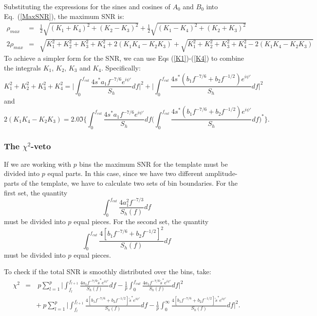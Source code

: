 Substituting the expressions for the sines and cosines of $A_0$ and
$B_0$
into Eq.~(\ref{MaxSNR}), the maximum SNR is:
\begin{eqnarray}
 \rho_{max} &=& \frac{1}{2} \sqrt{(K_1+K_4)^2 + (K_2-K_3)^2} +
\frac{1}{2} \sqrt{(K_1-K_4)^2 +(K_2+K_3)^2}\\
2\rho_{max}&=& \sqrt{ K_1^2 + K_2^2 + K_3^2 +K_4^2 + 2(K_1 K_4
	- K_2 K_3)} + \sqrt{  K_1^2 + K_2^2 + K_3^2 +K_4^2 -2(K_1
	K_4 -  K_2 K_3)} 
\end{eqnarray}
To achieve a simpler form for the SNR, we can use Eqs (\ref{K1})-(\ref{K4}) to 
combine the integrals $K_1$, $K_2$, $K_3$ and $K_4$.
Specifically:
\begin{equation}
K_1^2 + K_2^2 + K_3^2 + K_4^2 = \Big | \int_0^{f_{cut}} \frac{4 s^{\ast} a_1
	f^{-7/6} e^{i \psi'}}{S_h} df \Big |^2 + \Big | \int_0^{f_{cut}}
	\frac{4 s^{\ast} (b_1 f^{-7/6} + b_2 f^{-1/2}) e^{i \psi'}}{S_h} df
	\Big |^2
\end{equation}
and
\begin{equation}
2(K_1 K_4- K_2 K_3) =  2.0 \Im \Big \{ \int_0^{f_{cut}} \frac{4 s^{\ast} a_1
	f^{-7/6} e^{i \psi'}}{S_h} df \Big (\int_0^{f_{cut}} \frac{4 s^{\ast}
	(b_1 f^{-7/6} + b_2 f^{-1/2}) e^{i \psi'}}{S_h}df\Big )^{\ast} \Big \}.
\end{equation}

\subsubsection*{The $\chi^2$-veto}
\label{ChisquaredVeto}

If we are working with $p$ bins the maximum SNR for the template must be 
divided into $p$ equal parts. In this case, since we have two different 
amplitude-parts of the template, we have to calculate two sets of bin
boundaries.
For the first set, the quantity
\begin{displaymath}
\int_0^{f_{cut}} \frac{4 a_1^2 f^{-7/3}}{S_h(f)} df
\end{displaymath}
must be divided into $p$ equal pieces.
For the second set, the quantity
\begin{displaymath}
\int_0^{f_{cut}} \frac{4 [b_1 f^{-7/6} + b_2 f^{-1/2}]^2}{S_h(f)} df
\end{displaymath} 
must be divided into $p$ equal pieces.

To check if the total SNR is smoothly distributed over the bins,
take:
\begin{eqnarray}
\chi^2 &=& \: p \sum_{l=1}^p  \Big | \int_{f_l}^{f_{l+1}} \frac{4 a_1 
     f^{-7/6} \tilde{s}^{\ast} e^{i \psi'}}{S_h(f)} df
     - \frac{1}{p} \int_{0}^{f_{cut}} \frac{4 a_1 f^{-7/6}
 \tilde{s}^{\ast} e^{i \psi'}}{S_h(f)} df \Big |^2 \\
      && +\: p\sum_{l=1}^p\Big | \int_{f_l}^{f_{l+1}} \frac{4[b_1 f^{-7/6}
	+ b_2 f^{-1/2} ]
     \tilde{s}^{\ast} e^{i \psi'}}{S_h(f)} df-\frac{1}{p} 
     \int_{0}^{\infty} \frac{4[b_1 f^{-7/6} + b_2 f^{-1/2}]
\tilde{s}^{\ast} e^{i \psi'}}{S_h(f)} df\Big |^2. \\
\end{eqnarray}

